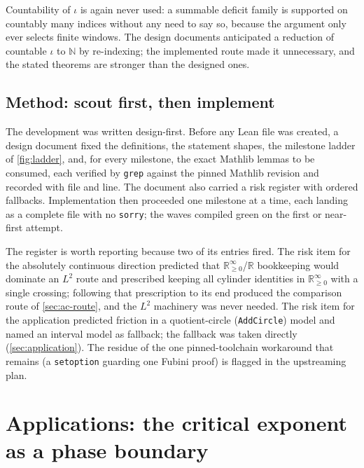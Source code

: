 \documentclass[a4paper,UKenglish,autoref,thm-restate]{lipics-v2021}
\newcommand{\ennreal}{\ensuremath{\mathbb{R}_{\ge 0}^{\infty}}}
\newcommand{\leanid}[1]{{\def\_{\textunderscore\allowbreak}\texttt{#1}}}
\begin{document}
Countability of $\iota$ is again never used: a summable deficit family is
supported on countably many indices without any need to say so, because the
argument only ever selects finite windows. The design documents anticipated a
reduction of countable $\iota$ to $\mathbb{N}$ by re-indexing; the implemented
route made it unnecessary, and the stated theorems are stronger than the
designed ones.

\subsection{Method: scout first, then implement}
\label{sec:method}

The development was written design-first. Before any Lean file was created, a
design document fixed the definitions, the statement shapes, the milestone
ladder of \autoref{fig:ladder}, and, for every milestone, the exact Mathlib
lemmas to be consumed, each verified by \texttt{grep} against the pinned
Mathlib revision and recorded with file and line. The document also carried a
risk register with ordered fallbacks. Implementation then proceeded one
milestone at a time, each landing as a complete file with no
\texttt{sorry}; the waves compiled green on the first or near-first attempt.

The register is worth reporting because two of its entries fired. The risk
item for the absolutely continuous direction predicted that
\ennreal/$\mathbb{R}$ bookkeeping would dominate an $L^2$ route and prescribed
keeping all cylinder identities in \ennreal{} with a single crossing;
following that prescription to its end produced the comparison route of
\autoref{sec:ac-route}, and the $L^2$ machinery was never needed. The risk
item for the application predicted friction in a quotient-circle
(\leanid{AddCircle}) model and named an interval model as fallback; the
fallback was taken directly (\autoref{sec:application}). The residue of the
one pinned-toolchain workaround that remains
(a \leanid{set\_option} guarding one Fubini proof) is flagged in the
upstreaming plan.

\section{Applications: the critical exponent as a phase boundary}
\label{sec:application}
\end{document}
